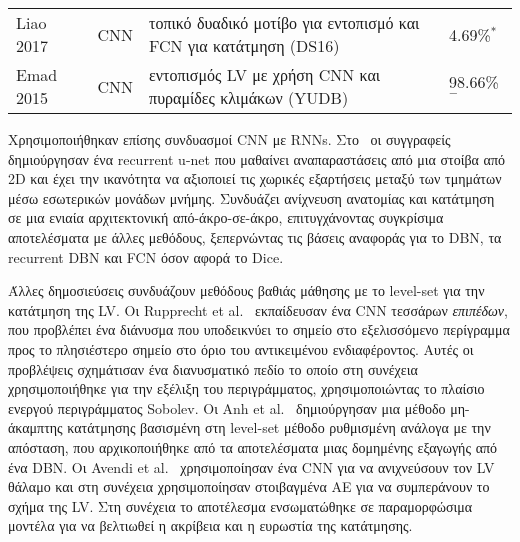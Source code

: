 \begin{sidewaystable}
\begin{tabular}{l c l l}
		Liao 2017~\cite{liao2017estimation}         & CNN             & τοπικό δυαδικό μοτίβο για εντοπισμό και FCN για κατάτμηση (DS16)                                           & 4.69\%$^*$                                                                                                                                                                                                                                      \\
		Emad 2015~\cite{emad2015automatic}          & CNN             & εντοπισμός LV με χρήση CNN και πυραμίδες κλιμάκων (YUDB)                                                   & 98.66\%$^-$                                                                                                                                                                                                                                     \\
		\bottomrule
	\end{tabular}
\end{sidewaystable}

Χρησιμοποιήθηκαν επίσης συνδυασμοί CNN με RNNs.
Στο~\cite{poudel2016recurrent} οι συγγραφείς δημιούργησαν ένα recurrent u-net που μαθαίνει αναπαραστάσεις από μια στοίβα από 2D και έχει την ικανότητα να αξιοποιεί τις χωρικές εξαρτήσεις μεταξύ των τμημάτων μέσω εσωτερικών μονάδων μνήμης.
Συνδυάζει ανίχνευση ανατομίας και κατάτμηση σε μια ενιαία αρχιτεκτονική από-άκρο-σε-άκρο, επιτυγχάνοντας συγκρίσιμα αποτελέσματα με άλλες μεθόδους, ξεπερνώντας τις βάσεις αναφοράς για το DBN, τα recurrent DBN και FCN όσον αφορά το Dice.

Άλλες δημοσιεύσεις συνδυάζουν μεθόδους βαθιάς μάθησης με το level-set για την κατάτμηση της LV\@.
Οι Rupprecht et al.~\cite{rupprecht2016deep} εκπαίδευσαν ένα CNN τεσσάρων \textit{επιπέδων}, που προβλέπει ένα διάνυσμα που υποδεικνύει το σημείο στο εξελισσόμενο περίγραμμα προς το πλησιέστερο σημείο στο όριο του αντικειμένου ενδιαφέροντος.
Αυτές οι προβλέψεις σχημάτισαν ένα διανυσματικό πεδίο το οποίο στη συνέχεια χρησιμοποιήθηκε για την εξέλιξη του περιγράμματος, χρησιμοποιώντας το πλαίσιο ενεργού περιγράμματος Sobolev.
Οι Anh et al.~\cite{anh2014fully} δημιούργησαν μια μέθοδο μη-άκαμπτης κατάτμησης βασισμένη στη level-set μέθοδο ρυθμισμένη ανάλογα με την απόσταση, που αρχικοποιήθηκε από τα αποτελέσματα μιας δομημένης εξαγωγής από ένα DBN\@.
Οι Avendi et al.~\cite{avendi2016combined} χρησιμοποίησαν ένα CNN για να ανιχνεύσουν τον LV θάλαμο και στη συνέχεια χρησιμοποίησαν στοιβαγμένα AE για να συμπεράνουν το σχήμα της LV\@.
Στη συνέχεια το αποτέλεσμα ενσωματώθηκε σε παραμορφώσιμα μοντέλα για να βελτιωθεί η ακρίβεια και η ευρωστία της κατάτμησης.

